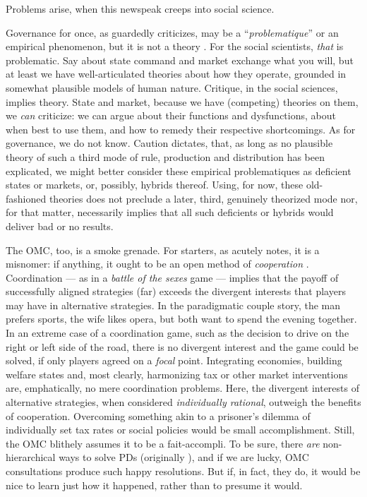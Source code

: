 \documentclass[11pt,a4paper,oneside]{article}
\begin{document}
Problems arise, when this newspeak creeps into social science.

Governance for once, as \citeauthor{Jachtenfuchs2001} guardedly criticizes, may be a ``\emph{problematique}'' or an empirical phenomenon, but it is not a theory \citeyearpar[259]{Jachtenfuchs2001}.
For the social scientists, \emph{that} is problematic.
Say about state command and market exchange what you will, but at least we have well-articulated theories about how they operate, grounded in somewhat plausible models of human nature.
Critique, in the social sciences, implies theory.
State and market, because we have (competing) theories on them, we \emph{can} criticize:
we can argue about their functions and dysfunctions, about when best to use them, and how to remedy their respective shortcomings.
As for governance, we do not know.
Caution dictates, that, as long as no plausible theory of such a third mode of rule, production and distribution has been explicated, we might better consider these empirical problematiques as deficient states or markets, or, possibly, hybrids thereof.
Using, for now, these old-fashioned theories does not preclude a later, third, genuinely theorized mode nor, for that matter, necessarily implies that all such deficients or hybrids would deliver bad or no results.

The \gls{OMC}, too, is a smoke grenade.
For starters, as \citeauthor{Offe2003} acutely notes, it is a misnomer:
if anything, it ought to be an open method of \emph{cooperation} \citeyearpar[467]{Offe2003}.
Coordination --- as in a \emph{battle of the sexes} game --- implies that the payoff of successfully aligned strategies (far) exceeds the divergent interests that players may have in alternative strategies.
In the paradigmatic couple story, the man prefers sports, the wife likes opera, but both want to spend the evening together.
In an extreme case of a coordination game, such as the decision to drive on the right or left side of the road, there is no divergent interest and the game could be solved, if only players agreed on a \emph{focal} point.
Integrating economies, building welfare states and, most clearly, harmonizing tax or other market interventions are, emphatically, no mere coordination problems.
Here, the divergent interests of alternative strategies, when considered \emph{individually rational}, outweigh the benefits of cooperation.
Overcoming something akin to a prisoner's dilemma of individually set tax rates or social policies would be small accomplishment.
Still, the \gls{OMC} blithely assumes it to be a fait-accompli.
To be sure, there \emph{are} non-hierarchical ways to solve \glspl{PD} (originally \citealt{Axelrod1980}), and if we are lucky, \gls{OMC} consultations produce such happy resolutions.
But if, in fact, they do, it would be nice to learn just how it happened, rather than to presume it would.
\end{document}
